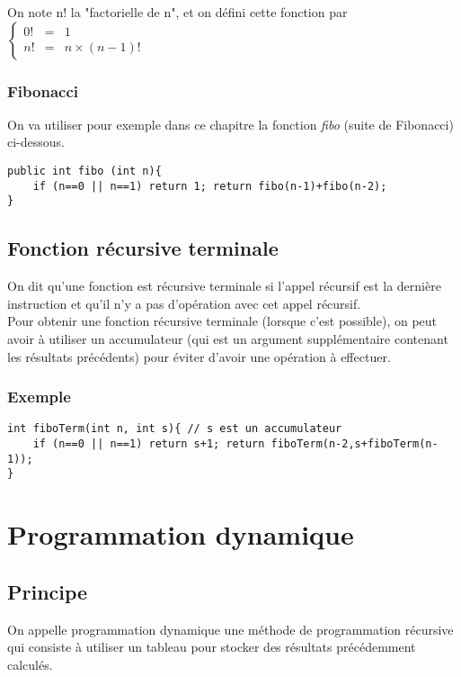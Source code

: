 \documentclass[a4paper,10pt]{book} %
\begin{document}
On note n! la "factorielle de n", et on défini cette fonction par $\left\{\begin{array}{rcl}
0!&=& 1 \\ n!&=& n\times (n-1)! \end{array} \right.$

\subsubsection{Fibonacci}
On va utiliser pour exemple dans ce chapitre la fonction \textit{fibo} (suite de Fibonacci) ci-dessous.

\begin{lstlisting}
public int fibo (int n){
	if (n==0 || n==1) return 1; return fibo(n-1)+fibo(n-2);
}
\end{lstlisting}

\subsection{Fonction récursive terminale}
On dit qu'une fonction est récursive terminale si l'appel récursif est la dernière instruction et qu'il n'y a pas d'opération avec cet appel récursif.\\

Pour obtenir une fonction récursive terminale (lorsque c'est possible), on peut avoir à utiliser un accumulateur (qui est un argument supplémentaire contenant les résultats précédents) pour éviter d'avoir une opération à effectuer.

\subsubsection{Exemple}
\begin{lstlisting}
int fiboTerm(int n, int s){ // s est un accumulateur
	if (n==0 || n==1) return s+1; return fiboTerm(n-2,s+fiboTerm(n-1));
}
\end{lstlisting}

\newpage

\section{Programmation dynamique}
\subsection{Principe}
On appelle programmation dynamique une méthode de programmation récursive qui consiste à utiliser un tableau pour stocker des résultats précédemment calculés.\\
\end{document}
